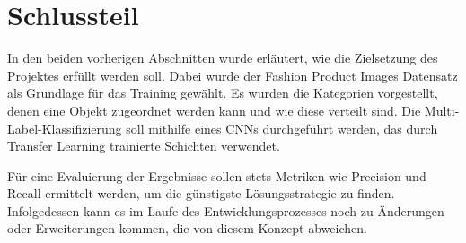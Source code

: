 \section{Schlussteil} \label{sec:conclusion}

In den beiden vorherigen Abschnitten wurde erläutert, wie die Zielsetzung des Projektes erfüllt werden soll. Dabei wurde der Fashion Product Images Datensatz als Grundlage für das Training gewählt. Es wurden die Kategorien vorgestellt, denen eine Objekt zugeordnet werden kann und wie diese verteilt sind. Die Multi-Label-Klassifizierung soll mithilfe eines CNNs durchgeführt werden, das durch Transfer Learning trainierte Schichten verwendet. 

Für eine Evaluierung der Ergebnisse sollen stets Metriken wie Precision und Recall ermittelt werden, um die günstigste Lösungsstrategie zu finden. Infolgedessen kann es im Laufe des Entwicklungsprozesses noch zu Änderungen oder Erweiterungen kommen, die von diesem Konzept abweichen.